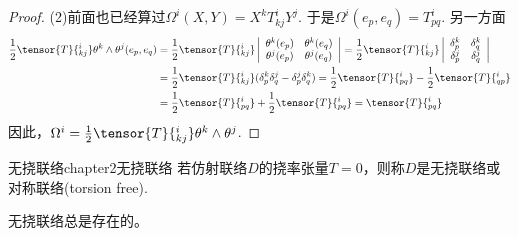 \begin{proof}
	(2)\;前面也已经算过$\Omega ^{i}(X,Y)=X^{k}T_{kj}^{i}Y^{j}$. 于是$\Omega ^{i}(e_{p},e_{q})=T_{pq}^{i}$. 另一方面
	\[
	\begin{split}
	\frac{1}{2}\tensor{T}{^i_{kj}}\theta^{k}\wedge\theta^{j}(e_{p},e_{q})&=\frac{1}{2}\tensor{T}{^i_{kj}}\left| \begin{array}{cc}{\theta^{k}(e_{p})} & {\theta^{k}(e_{q})}\\ {\theta^{j}(e_{p})} & {\theta^{j}(e_{q})}\\ \end{array}\right|=\frac{1}{2}\tensor{T}{^i_{kj}}\left| \begin{array}{cc}{\delta_{p}^{k}} & {\delta_{q}^{k}}\\ {\delta_{p}^{j}} & {\delta_{q}^{j}}\\ \end{array}\right|\\
	&=\frac{1}{2}\tensor{T}{^i_{kj}}(\delta_{p}^{k}\delta_{q}^{j}-\delta_{p}^{j}\delta_{q}^{k})=\frac{1}{2}\tensor{T}{^i_{pq}}-\frac{1}{2}\tensor{T}{^i_{qp}}\\
	&=\frac{1}{2}\tensor{T}{^i_{pq}}+\frac{1}{2}\tensor{T}{^i_{pq}}=\tensor{T}{^i_{pq}}
	\end{split}
	\]
	因此，$\Omega^{i}=\frac{1}{2}\tensor{T}{^i_{kj}}\theta^{k}\wedge\theta^{j}$.
\end{proof}

\begin{mydef}{无挠联络}{chapter2无挠联络}
	若仿射联络$D$的挠率张量$T=0$，则称$D$是无挠联络或对称联络(torsion free).
\end{mydef}
无挠联络总是存在的。


